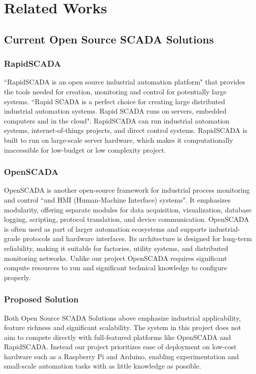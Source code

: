 \documentclass[../main.tex]{subfiles}
\begin{document}
\section{Related Works}
\label{sec:rel}

\subsection{Current Open Source SCADA Solutions}

\subsubsection{RapidSCADA}\label{subsubsec_rapidSCADA-4810FP}
\par ``RapidSCADA is an open source industrial automation platform"\cite{b5} that provides the tools needed for creation, monitoring and control for potentially large systems. ``Rapid SCADA is a perfect choice for creating large distributed industrial automation systems. Rapid SCADA runs on servers, embedded computers and in the cloud"\cite{b5}. RapidSCADA can run industrial automation systems, internet-of-things projects, and direct control systems. RapidSCADA is built to run on large-scale server hardware, which makes it computationally inaccessible for low-budget or low complexity project.

\subsubsection{OpenSCADA}
\par OpenSCADA is another open-source framework for industrial process monitoring and control ``and HMI (Human-Machine Interface) systems"\cite{b6}. It emphasizes modularity, offering separate modules for data acquisition, visualization, database logging, scripting, protocol translation, and device communication. OpenSCADA is often used as part of larger automation ecosystems and supports industrial-grade protocols and hardware interfaces. Its architecture is designed for long-term reliability, making it suitable for factories, utility systems, and distributed monitoring networks. Unlike our project OpenSCADA requires significant compute resources to run and significant technical knowledge to configure properly.

\subsubsection{Proposed Solution}
\par Both Open Source SCADA Solutions above emphasize industrial applicability, feature richness and significant scalability. The system in this project does not aim to compete directly with full-featured platforms like OpenSCADA and RapidSCADA. Instead our project prioritizes ease of deployment on low-cost hardware such as a Raspberry Pi and Arduino, enabling experimentation and small-scale automation tasks with as little knowledge as possible.
\end{document}
